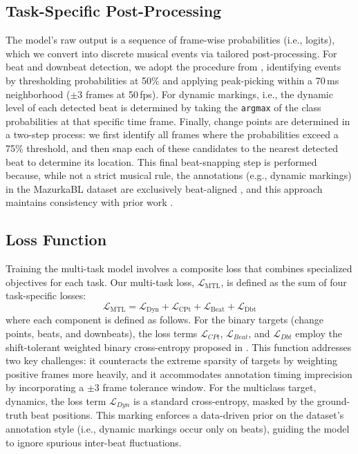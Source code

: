 \documentclass{article}
\begin{document}
\subsection{Task-Specific Post-Processing}
\label{ssec:post}
The model’s raw output is a sequence of frame-wise probabilities (i.e., logits), which we convert into discrete musical events via tailored post-processing. For beat and downbeat detection, we adopt the procedure from \cite{foscarin2024beat}, identifying events by thresholding probabilities at 50\% and applying peak-picking within a 70\,ms neighborhood ($\pm3$ frames at 50\,fps). For dynamic markings, i.e., the dynamic level of each detected beat is determined by taking the \texttt{argmax} of the class probabilities at that specific time frame. Finally, change points are determined in a two-step process: we first identify all frames where the probabilities exceed a 75\% threshold, and then snap each of these candidates to the nearest detected beat to determine its location. This final beat-snapping step is performed because, while not a strict musical rule, the annotations (e.g., dynamic markings) in the MazurkaBL dataset are exclusively beat-aligned \cite{kosta2018mazurkabl}, and this approach maintains consistency with prior work \cite{kosta2017thesis}.


\subsection{Loss Function}
\label{ssec:loss}
Training the multi-task model involves a composite loss that combines specialized objectives for each task. Our multi-task loss, $\mathcal{L}_\mathrm{MTL}$, is defined as the sum of four task-specific losses:
\begin{equation}
\mathcal{L}_{\mathrm{MTL}}
= \mathcal{L}_{\mathrm{Dyn}}
+ \mathcal{L}_{\mathrm{CPt}}
+ \mathcal{L}_{\mathrm{Beat}}
+ \mathcal{L}_{\mathrm{Dbt}}
\end{equation}
where each component is defined as follows. For the binary targets (change points, beats, and downbeats), the loss terms $\mathcal{L}_{CPt}$, $\mathcal{L}_{Beat}$, and $\mathcal{L}_{Dbt}$ employ the shift-tolerant weighted binary cross-entropy proposed in \cite{foscarin2024beat}. This function addresses two key challenges: it counteracts the extreme sparsity of targets by weighting positive frames more heavily, and it accommodates annotation timing imprecision by incorporating a $\pm3$ frame tolerance window. For the multiclass target, dynamics, the loss term $\mathcal{L}_{Dyn}$ is a standard cross-entropy, masked by the ground-truth beat positions. This marking enforces a data-driven prior on the dataset's annotation style (i.e., dynamic markings occur only on beats), guiding the model to ignore spurious inter-beat fluctuations.
\end{document}
